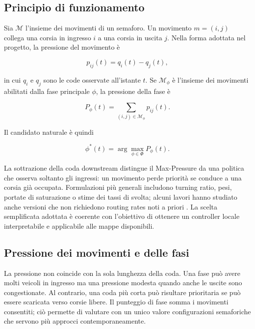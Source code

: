 \documentclass[12pt,a4paper,oneside]{report}
\numberwithin{equation}{chapter}
\begin{document}
\subsection{Principio di funzionamento}

Sia $\mathcal{M}$ l'insieme dei movimenti di un semaforo. Un movimento
$m=(i,j)$ collega una corsia in ingresso $i$ a una corsia in uscita $j$. Nella
forma adottata nel progetto, la pressione del movimento è

\begin{equation}
    p_{ij}(t)=q_i(t)-q_j(t),
    \label{eq:movement-pressure}
\end{equation}

in cui $q_i$ e $q_j$ sono le code osservate all'istante $t$. Se
$\mathcal{M}_\phi$ è l'insieme dei movimenti abilitati dalla fase principale
$\phi$, la pressione della fase è

\begin{equation}
    P_\phi(t)=\sum_{(i,j)\in\mathcal{M}_\phi}p_{ij}(t).
    \label{eq:phase-pressure}
\end{equation}

Il candidato naturale è quindi

\begin{equation}
    \phi^*(t)=\arg\max_{\phi\in\Phi}P_\phi(t).
    \label{eq:mp-choice}
\end{equation}

La sottrazione della coda downstream distingue il Max-Pressure da una politica
che osserva soltanto gli ingressi: un movimento perde priorità se conduce a
una corsia già occupata. Formulazioni più generali includono turning ratio,
pesi, portate di saturazione o stime dei tassi di svolta; alcuni lavori hanno
studiato anche versioni che non richiedono routing rates noti a priori
\cite{gregoire2014unknownrouting}. La scelta semplificata adottata è coerente
con l'obiettivo di ottenere un controller locale interpretabile e applicabile
alle mappe disponibili.

\subsection{Pressione dei movimenti e delle fasi}

La pressione non coincide con la sola lunghezza della coda. Una fase può avere
molti veicoli in ingresso ma una pressione modesta quando anche le uscite sono
congestionate. Al contrario, una coda più corta può risultare prioritaria se
può essere scaricata verso corsie libere. Il punteggio di fase somma i
movimenti consentiti; ciò permette di valutare con un unico valore configurazioni
semaforiche che servono più approcci contemporaneamente.
\end{document}

